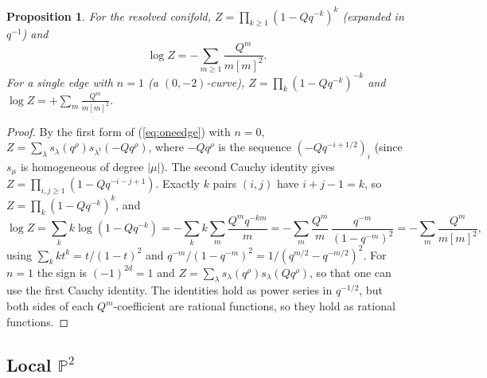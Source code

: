 \documentclass[11pt]{article}
\theoremstyle{plain}
\newtheorem{proposition}[theorem]{Proposition}
\theoremstyle{definition}
\theoremstyle{remark}
\newcommand{\PP}{\mathbb{P}}
\newcommand{\qrho}{q^{\rho}}
\newcommand{\tr}{{\mathsf t}}
\newcommand{\lt}[1]{#1^{\tr}}
\begin{document}
\begin{proposition}\label{prop:conifold}
For the resolved conifold, $Z=\prod_{k\ge1}(1-Qq^{-k})^{k}$ (expanded in $q^{-1}$) and
\begin{equation}\label{eq:conifoldF}
\log Z=-\sum_{m\ge1}\frac{Q^m}{m[m]^2}.
\end{equation}
For a single edge with $n=1$ (a $(0,-2)$-curve), $Z=\prod_k(1-Qq^{-k})^{-k}$ and
$\log Z=+\sum_m\frac{Q^m}{m[m]^2}$.
\end{proposition}
\begin{proof}
By the first form of (\ref{eq:oneedge}) with $n=0$, $Z=\sum_\lambda s_\lambda(\qrho)
s_{\lt\lambda}(-Q\qrho)$, where $-Q\qrho$ is the sequence $(-Qq^{-i+1/2})_i$ (since $s_\mu$ is
homogeneous of degree $|\mu|$). The second Cauchy identity gives
$Z=\prod_{i,j\ge1}(1-Qq^{-i-j+1})$. Exactly $k$ pairs $(i,j)$ have $i+j-1=k$, so
$Z=\prod_k(1-Qq^{-k})^k$, and
\begin{equation}
\log Z=\sum_kk\log(1-Qq^{-k})=-\sum_k k\sum_m\frac{Q^mq^{-km}}{m}
=-\sum_m\frac{Q^m}{m}\,\frac{q^{-m}}{(1-q^{-m})^2}=-\sum_m\frac{Q^m}{m[m]^2},
\end{equation}
using $\sum_kkt^k=t/(1-t)^2$ and $q^{-m}/(1-q^{-m})^2=1/(q^{m/2}-q^{-m/2})^2$. For $n=1$ the sign is
$(-1)^{2d}=1$ and $Z=\sum_\lambda s_\lambda(\qrho)s_\lambda(Q\qrho)$, so that one can use the first Cauchy
identity. The identities hold as power series in $q^{-1/2}$, but both sides of each
$Q^m$-coefficient are rational functions, so they hold as rational functions.
\end{proof}

\subsection{Local \texorpdfstring{$\PP^2$}{P2}}\label{ssec:P2}
\end{document}
